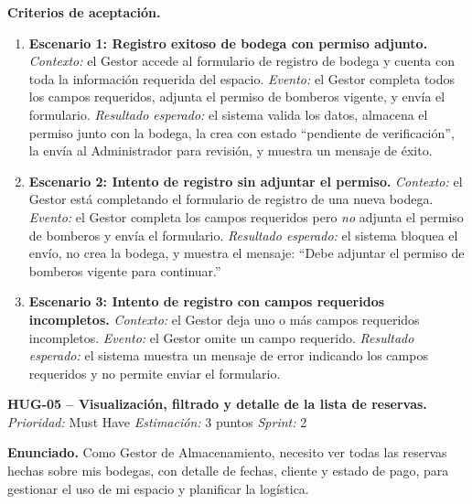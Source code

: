 \textbf{Criterios de aceptación.}
\begin{enumerate}
\item \textbf{Escenario 1: Registro exitoso de bodega con permiso adjunto.} \textit{Contexto:} el Gestor accede al formulario de registro de bodega y cuenta con toda la información requerida del espacio. \textit{Evento:} el Gestor completa todos los campos requeridos, adjunta el permiso de bomberos vigente, y envía el formulario. \textit{Resultado esperado:} el sistema valida los datos, almacena el permiso junto con la bodega, la crea con estado ``pendiente de verificación'', la envía al Administrador para revisión, y muestra un mensaje de éxito.
\item \textbf{Escenario 2: Intento de registro sin adjuntar el permiso.} \textit{Contexto:} el Gestor está completando el formulario de registro de una nueva bodega. \textit{Evento:} el Gestor completa los campos requeridos pero \textit{no} adjunta el permiso de bomberos y envía el formulario. \textit{Resultado esperado:} el sistema bloquea el envío, no crea la bodega, y muestra el mensaje: ``Debe adjuntar el permiso de bomberos vigente para continuar.''
\item \textbf{Escenario 3: Intento de registro con campos requeridos incompletos.} \textit{Contexto:} el Gestor deja uno o más campos requeridos incompletos. \textit{Evento:} el Gestor omite un campo requerido. \textit{Resultado esperado:} el sistema muestra un mensaje de error indicando los campos requeridos y no permite enviar el formulario.
\end{enumerate}

\textbf{HUG-05 -- Visualización, filtrado y detalle de la lista de reservas.} \label{req:HUG-05}
\textit{Prioridad:} Must Have \quad \textit{Estimación:} 3 puntos \quad \textit{Sprint:} 2

\textbf{Enunciado.} Como Gestor de Almacenamiento, necesito ver todas las reservas hechas sobre mis bodegas, con detalle de fechas, cliente y estado de pago, para gestionar el uso de mi espacio y planificar la logística.

